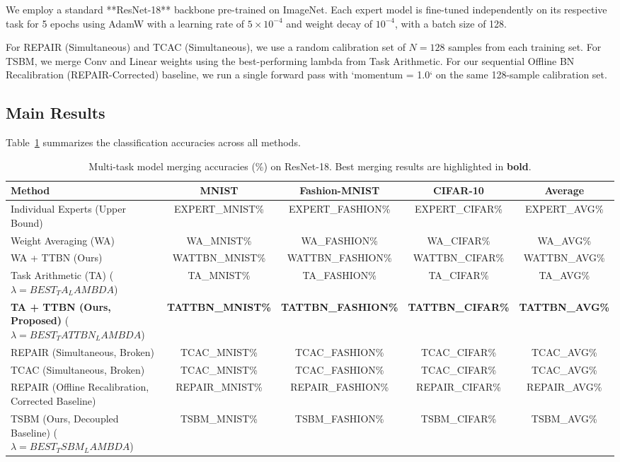 \documentclass{article}
\theoremstyle{plain}
\theoremstyle{definition}
\theoremstyle{remark}
\begin{document}
We employ a standard **ResNet-18** backbone pre-trained on ImageNet. Each expert model is fine-tuned independently on its respective task for 5 epochs using AdamW with a learning rate of $5 \times 10^{-4}$ and weight decay of $10^{-4}$, with a batch size of 128.

For REPAIR (Simultaneous) and TCAC (Simultaneous), we use a random calibration set of $N=128$ samples from each training set. For TSBM, we merge Conv and Linear weights using the best-performing lambda from Task Arithmetic. For our sequential Offline BN Recalibration (REPAIR-Corrected) baseline, we run a single forward pass with `momentum = 1.0` on the same 128-sample calibration set.

\subsection{Main Results}

Table~\ref{tab:results} summarizes the classification accuracies across all methods.

\begin{table}[t]
\caption{Multi-task model merging accuracies (\%) on ResNet-18. Best merging results are highlighted in \textbf{bold}.}
\label{tab:results}
\vskip 0.15in
\begin{center}
\begin{small}
\begin{tabular}{lcccc}
\toprule
Method & MNIST & Fashion-MNIST & CIFAR-10 & Average \\
\midrule
Individual Experts (Upper Bound) & {{EXPERT_MNIST}}\% & {{EXPERT_FASHION}}\% & {{EXPERT_CIFAR}}\% & {{EXPERT_AVG}}\% \\
\midrule
Weight Averaging (WA) & {{WA_MNIST}}\% & {{WA_FASHION}}\% & {{WA_CIFAR}}\% & {{WA_AVG}}\% \\
WA + TTBN (Ours) & {{WATTBN_MNIST}}\% & {{WATTBN_FASHION}}\% & {{WATTBN_CIFAR}}\% & {{WATTBN_AVG}}\% \\
Task Arithmetic (TA) ($\lambda = {{BEST_TA_LAMBDA}}$) & {{TA_MNIST}}\% & {{TA_FASHION}}\% & {{TA_CIFAR}}\% & {{TA_AVG}}\% \\
\textbf{TA + TTBN (Ours, Proposed)} ($\lambda = {{BEST_TATTBN_LAMBDA}}$) & \textbf{{{TATTBN_MNIST}}\%} & \textbf{{{TATTBN_FASHION}}\%} & \textbf{{{TATTBN_CIFAR}}\%} & \textbf{{{TATTBN_AVG}}\%} \\
\midrule
REPAIR (Simultaneous, Broken) & {{TCAC_MNIST}}\% & {{TCAC_FASHION}}\% & {{TCAC_CIFAR}}\% & {{TCAC_AVG}}\% \\
TCAC (Simultaneous, Broken) & {{TCAC_MNIST}}\% & {{TCAC_FASHION}}\% & {{TCAC_CIFAR}}\% & {{TCAC_AVG}}\% \\
REPAIR (Offline Recalibration, Corrected Baseline) & {{REPAIR_MNIST}}\% & {{REPAIR_FASHION}}\% & {{REPAIR_CIFAR}}\% & {{REPAIR_AVG}}\% \\
\midrule
TSBM (Ours, Decoupled Baseline) ($\lambda = {{BEST_TSBM_LAMBDA}}$) & {{TSBM_MNIST}}\% & {{TSBM_FASHION}}\% & {{TSBM_CIFAR}}\% & {{TSBM_AVG}}\% \\
\bottomrule
\end{tabular}
\end{small}
\end{center}
\vskip -0.1in
\end{table}
\end{document}
